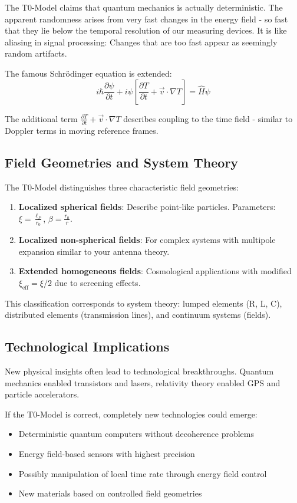 The T0-Model claims that quantum mechanics is actually deterministic. The apparent randomness arises from very fast changes in the energy field - so fast that they lie below the temporal resolution of our measuring devices. It is like aliasing in signal processing: Changes that are too fast appear as seemingly random artifacts.

The famous Schrödinger equation is extended:
$$i\hbar\frac{\partial\psi}{\partial t} + i\psi\left[\frac{\partial T}{\partial t} + \vec{v} \cdot \nabla T\right] = \hat{H}\psi$$

The additional term $\frac{\partial T}{\partial t} + \vec{v} \cdot \nabla T$ describes coupling to the time field - similar to Doppler terms in moving reference frames.

\subsection{Field Geometries and System Theory}

The T0-Model distinguishes three characteristic field geometries:

\begin{enumerate}
	\item \textbf{Localized spherical fields}: Describe point-like particles. Parameters: $\xi = \frac{\ell_P}{r_0}$, $\beta = \frac{r_0}{r}$.
	\item \textbf{Localized non-spherical fields}: For complex systems with multipole expansion similar to your antenna theory.
	\item \textbf{Extended homogeneous fields}: Cosmological applications with modified $\xi_{\text{eff}} = \xi/2$ due to screening effects.
\end{enumerate}

This classification corresponds to system theory: lumped elements (R, L, C), distributed elements (transmission lines), and continuum systems (fields).

\subsection{Technological Implications}

New physical insights often lead to technological breakthroughs. Quantum mechanics enabled transistors and lasers, relativity theory enabled GPS and particle accelerators.

If the T0-Model is correct, completely new technologies could emerge:
\begin{itemize}
	\item Deterministic quantum computers without decoherence problems
	\item Energy field-based sensors with highest precision
	\item Possibly manipulation of local time rate through energy field control
	\item New materials based on controlled field geometries
\end{itemize}

